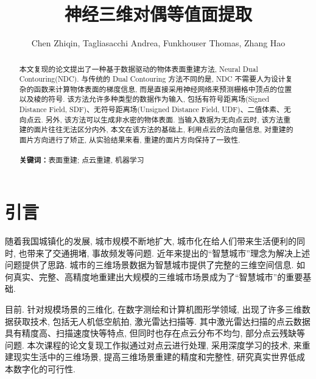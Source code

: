 
\usepackage[algo2e]{algorithm2e}
\usepackage{tabularx}
\usepackage{graphicx}
\usepackage{listings}
\usepackage{xcolor}

\title{神经三维对偶等值面提取}
\author{Chen Zhiqin, Tagliasacchi Andrea, Funkhouser Thomas, Zhang Hao}

 
\maketitle

\begin{abstract}
    本文复现的论文提出了一种基于数据驱动的物体表面重建方法, Neural Dual Contouring(NDC)\cite{chen2022neural}. 与传统的 Dual Contouring \cite{ju2002dual}方法不同的是, NDC 不需要人为设计复杂的函数来计算物体表面的梯度信息, 而是直接采用神经网络来预测栅格中顶点的位置以及棱的符号. 该方法允许多种类型的数据作为输入, 包括有符号距离场(Signed Distance Field, SDF)、无符号距离场(Unsigned Distance Field, UDF)、二值体素、无向点云. 另外, 该方法可以生成非水密的物体表面. 当输入数据为无向点云时, 该方法重建的面片往往无法区分内外, 本文在该方法的基础上, 利用点云的法向量信息, 对重建的面片方向进行了矫正, 从实验结果来看, 重建的面片方向保持了一致性. 
 	\\\\
 	\textbf{关键词：}表面重建; 点云重建, 机器学习
\end{abstract}

\section{引言}

随着我国城镇化的发展, 城市规模不断地扩大, 城市化在给人们带来生活便利的同时, 也带来了交通拥堵, 事故频发等问题. 近年来提出的“智慧城市”理念为解决上述问题提供了思路. 城市的三维场景数据为智慧城市提供了完整的三维空间信息. 如何真实、完整、高精度地重建出大规模的三维城市场景成为了“智慧城市”的重要基础. 

目前. 针对规模场景的三维化, 在数字测绘和计算机图形学领域, 出现了许多三维数据获取技术, 包括无人机低空航拍, 激光雷达扫描等. 其中激光雷达扫描的点云数据具有精度高、扫描速度快等特点, 但同时也存在点云分布不均匀, 部分点云残缺等问题. 
本次课程的论文复现工作拟通过对点云进行处理, 采用深度学习的技术, 来重建现实生活中的三维场景, 提高三维场景重建的精度和完整性, 研究真实世界低成本数字化的可行性. 

